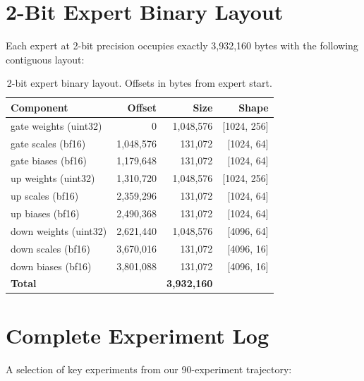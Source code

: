 \documentclass[11pt,twocolumn]{article}
\begin{document}
\section{2-Bit Expert Binary Layout}

Each expert at 2-bit precision occupies exactly 3{,}932{,}160 bytes with the following contiguous layout:

\begin{table}[h]
\centering
\small
\caption{2-bit expert binary layout. Offsets in bytes from expert start.}
\begin{tabular}{@{}lrrr@{}}
\toprule
\textbf{Component} & \textbf{Offset} & \textbf{Size} & \textbf{Shape} \\
\midrule
gate weights (uint32) & 0 & 1{,}048{,}576 & [1024, 256] \\
gate scales (bf16) & 1{,}048{,}576 & 131{,}072 & [1024, 64] \\
gate biases (bf16) & 1{,}179{,}648 & 131{,}072 & [1024, 64] \\
up weights (uint32) & 1{,}310{,}720 & 1{,}048{,}576 & [1024, 256] \\
up scales (bf16) & 2{,}359{,}296 & 131{,}072 & [1024, 64] \\
up biases (bf16) & 2{,}490{,}368 & 131{,}072 & [1024, 64] \\
down weights (uint32) & 2{,}621{,}440 & 1{,}048{,}576 & [4096, 64] \\
down scales (bf16) & 3{,}670{,}016 & 131{,}072 & [4096, 16] \\
down biases (bf16) & 3{,}801{,}088 & 131{,}072 & [4096, 16] \\
\midrule
\textbf{Total} & & \textbf{3{,}932{,}160} & \\
\bottomrule
\end{tabular}
\end{table}

\section{Complete Experiment Log}

A selection of key experiments from our 90-experiment trajectory:
\end{document}
